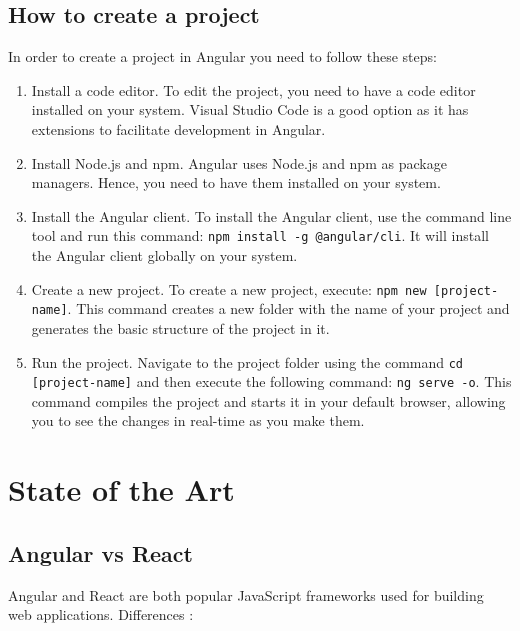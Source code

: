 \documentclass{article}
\begin{document}
  \subsection{How to create a project}
  In order to create a project in Angular \cite{angularSetupLocal,angularDocumentation, angularCreateAProject} you need to follow these steps:
  \begin{enumerate}
    \item Install a code editor. To edit the project, you need to have a code editor installed on your system. Visual Studio Code is a good option as it has extensions to facilitate development in Angular.
  \item Install Node.js and npm. Angular uses Node.js and npm as package managers. Hence, you need to have them installed on your system.
  \item Install the Angular client. To install the Angular client, use the command line tool and run this command: \verb|npm install -g @angular/cli|. It will install the Angular client globally on your system.
  \item Create a new project. To create a new project, execute: \verb|npm new [project-name]|. This command creates a new folder with the name of your project and generates the basic structure of the project in it.
  \item Run the project. Navigate to the project folder using the command \verb|cd [project-name]| and then execute the following command: \verb|ng serve -o|. This command compiles the project and starts it in your default browser, allowing you to see the changes in real-time as you make them.
  \end{enumerate}


  \section{State of the Art}
  \label{sec:state_of_the_art}

\subsection{Angular vs React}

Angular and React are both popular JavaScript frameworks used for building web applications. Differences \cite{biancagauca2017angularvsreact}:
\end{document}
